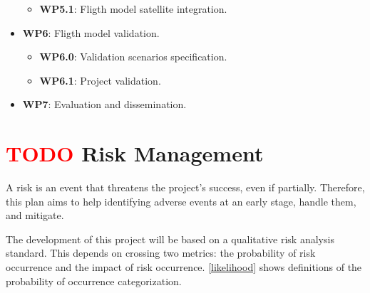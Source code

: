 \begin{itemize}
\begin{itemize}
            \item \textbf{WP5.1}: Fligth model satellite integration.
        \end{itemize}
    \item \textbf{WP6}: Fligth model validation.
        \begin{itemize}
            \item \textbf{WP6.0}: Validation scenarios specification.
            \item \textbf{WP6.1}: Project validation.
        \end{itemize}
    \item \textbf{WP7}: Evaluation and dissemination.
\end{itemize}


\section{ \textcolor{red}{TODO} Risk Management}

A risk is an event that threatens the project's success, even if partially. Therefore, this plan aims to help identifying adverse events at an early stage, handle them, and mitigate.

The development of this project will be based on a qualitative risk analysis standard. This depends on crossing two metrics: the probability of risk occurrence and the impact of risk occurrence. \autoref{likelihood} shows definitions of the probability of occurrence categorization.

